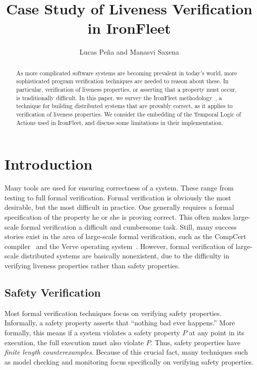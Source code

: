 \documentclass{llncs}
\begin{document}
%
\mainmatter              %
%
\title{Case Study of Liveness Verification in IronFleet}
%
\author{Lucas Pe\~{n}a and Manasvi Saxena}
%

\maketitle              %

\begin{abstract}
  As more complicated software systems are becoming prevalent in today's world,
  more sophisticated program verification techniques are needed to reason about
  these. In particular, verification of liveness properties, or asserting that a
  property must occur, is traditionally difficult. In this paper, we survey the
  IronFleet methodology~\cite{ironfleet}, a technique for building distributed
  systems that are provably correct, as it applies to verification of liveness
  properties. We consider the embedding of the Temporal Logic of Actions used in
  IronFleet, and discuss some limitations in their implementation.
\end{abstract}
%
\section{Introduction}
Many tools are used for ensuring correctness of a system. These range from
testing to full formal verification. Formal verification is obviously the most
desirable, but the most difficult in practice. One generally requires a formal
specification of the property he or she is proving correct. This often makes
large-scale formal verification a difficult and cumbersome task. Still, many
success stories exist in the area of large-scale formal verification, such as
the CompCert compiler~\cite{compcert} and the Verve operating
system~\cite{verve}. However, formal verification of large-scale distributed
systems are basically nonexistent, due to the difficulty in verifying liveness
properties rather than safety properties.

\subsection{Safety Verification}
Most formal verification techniques focus on verifying safety
properties. Informally, a safety property asserts that ``nothing bad ever
happens.'' More formally, this means if a system violates a safety property $P$
at any point in its execution, the full execution must also violate $P$. Thus,
safety properties have \textit{finite length counterexamples}. Because of this
crucial fact, many techniques such as model checking and monitoring focus
specifically on verifying safety properties.
\end{document}
